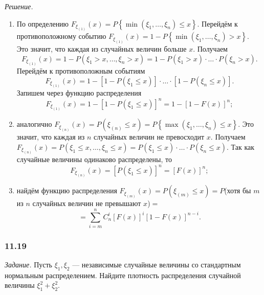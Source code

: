 \textit{Решение.}
\begin{enumerate}[label=\alph*)]
\item По определению
$F_{ \xi_{ \left( 1 \right) }} \left( x \right) =
P \left\{ \min \left( \xi_1, \dotsc, \xi_n \right) \leq x \right\}$.
Перейдём к противоположному событию
$F_{ \xi_{ \left( 1 \right) } } \left( x \right) =
1 - P \left\{ \min \left( \xi_1, \dotsc, \xi_n \right) > x \right\}$.
Это значит, что каждая из случайных величин больше $x$.
Получаем
$$F_{ \xi_{ \left( 1 \right) }} \left( x \right) =
1 - P \left( \xi_1 > x, \dotsc, \xi_n > x \right) =
1 - P \left( \xi_1 > x \right) \cdot \dotsc \cdot P \left( \xi_n > x \right).$$
Перейдём к противоположным событиям
$$F_{ \xi_{ \left( 1 \right) }} \left( x \right) =
1 - \left[ 1 - P \left( \xi_1 \leq x \right) \right] \cdot \dotsc \cdot \left[ 1 - P \left( \xi_n \leq x \right) \right].$$
Запишем через функцию распределения
$$F_{ \xi_{ \left( 1 \right) }} \left( x \right) =
1 - \left[ 1 - P \left( \xi_1 \leq x \right) \right]^n = 1 - \left[ 1 - F \left( x \right) \right]^n;$$
\item аналогично
$F_{ \xi_{ \left( n \right) }} \left( x \right) =
P \left( \xi_{ \left( n \right) } \leq x \right) =
P \left\{ \max \left( \xi_1, \dotsc, \xi_n \right) \leq x \right\}$.
Это значит, что каждая из $n$ случайных величин не превосходит $x$.
Получаем
$F_{ \xi_{ \left( n \right) }} \left( x \right) =
P \left( \xi_1 \leq x, \dotsc, \xi_n \leq x \right) =
P \left( \xi_1 \leq x \right) \cdot \dotsc \cdot P \left( \xi_n \leq x \right)$.
Так как случайные величины одинаково распределены, то
$$F_{ \xi_{ \left( n \right) }} \left( x \right) =
\left[ P \left( \xi_1 \leq x \right) \right]^n =
\left[ F \left( x \right) \right]^n;$$
\item  найдём функцию распределения $F_{ \xi_{\left( m \right) }} \left( x \right) = P \left( \xi_{ \left( m \right) } \leq x \right) = P$(хотя бы $m$ из $n$ случайных величин не превышают $x$)$=$
$$= \sum \limits_{i=m}^n C_n^i \left[ F \left( x \right) \right]^i \left[ 1 - F \left( x \right) \right]^{n-i}.$$
\end{enumerate}

\subsubsection*{11.19}

\textit{Задание.} Пусть $ \xi_1, \xi_2$ --- независимые случайные величины со стандартным нормальным распределением.
Найдите плотность распределения случайной величины $ \xi_1^2 + \xi_2^2$.

